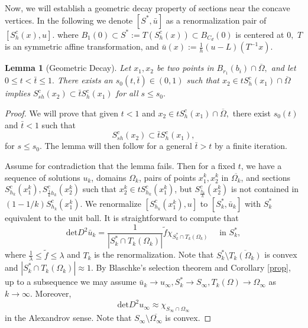 \documentclass[11pt]{amsart}
\theoremstyle{plain}
\newtheorem{lemma}{Lemma}[section]
\renewcommand{\det}{\mbox{det}}
\newcommand{\0}{\textbf{0}}
\numberwithin{equation}{section}
\numberwithin{equation}{section}
\numberwithin{figure}{section}
\begin{document}
	Now, we will establish a geometric decay property of sections near the concave vertices.
	In the following we denote $[S^*,\bar{u}]$ as a renormalization pair of $[S_h^c(x), u].$
	where $B_1(0)\subset S^*:=T(S_h^c(x))\subset B_{C_d}(0)$ is centered at $0,$  $T$ is an symmetric affine transformation, and $\bar{u}(x):=\frac{1}{h}(u-L)(T^{-1}x).$
	\begin{lemma}[Geometric Decay]\label{geodecay}
		Let $x_1,x_2$ be two points in $B_{r_1}(b_i)\cap \overline{\Omega},$ and let $0\leq t<\bar{t}\leq 1.$ There exists an $s_0(t,\bar{t})\in (0,1)$ such that $x_2\in t S^c_h(x_1)\cap \overline{\Omega}$ implies $S^c_{sh}(x_2)\subset \bar{t} S^c_h(x_1)$ for all $s\leq s_0.$
	\end{lemma}
	\begin{proof}
		We will prove that given $t<1$ and $x_2\in t S^c_h(x_1)\cap \overline{\Omega},$ there exist $s_0(t)$ and $\bar{t}<1$ such that
		$$
		S^c_{s h}\left(x_2\right) \subset \bar{t} S^c_h\left(x_1\right),
		$$
		for $s\leq s_0.$
		The lemma will then follow for a general $\bar{t}>t$ by a finite iteration.
		
		Assume for contradiction that the lemma fails. Then for a fixed $t$, we have a sequence of solutions $u_k$, domains $\Omega_k$, pairs of points $x_1^k, x_2^k$ in $\overline{\Omega_k}$, and sections $
		S^c_{h_k}\left(x_1^k\right), S^c_{\frac{1}{k} h_k}\left(x_2^k\right)
		$ such that $x_2^k \in t S^c_{h_k}\left(x_1^k\right)$, but $S^c_{\frac{h_k}{k}}\left(x_2^k\right)$ is not contained in $(1-1 / k) S^c_{h_k}\left(x_1^k\right)$. 
		We renormalize $\left[S^c_{h_k}\left(x_1^k\right), u\right]$ to $\left[S_k^*, \bar{u}_k\right]$ with $S_k^*$ equivalent to the unit ball. It is straightforward to compute that 
		$$\det D^2 \bar{u}_k=\frac{1}{|S_k^*\cap T_k(\Omega_k)|}\tilde{f}\chi_{S_k^*\cap T_k(\Omega_k)} \quad \text{ in }S^*_k,$$ where $\frac{1}{\lambda}\leq \tilde{f}\leq \lambda$ and $T_k$ is the renormalization. Note that $S_k^*\setminus \overline{T_k(\Omega_k)}$ is convex and $|S_k^*\cap T_k(\Omega_k)|\approx 1.$
		By Blaschke's selection theorem and Corollary \ref{prop}, up to a subsequence we may assume
		$\bar u_k\rightarrow u_\infty, S^*_k\rightarrow S_\infty, T_k(\Omega)\rightarrow \Omega_\infty$ as $k\rightarrow \infty.$ Moreover, $$\det D^2 u_{\infty}\approx \chi_{S_{\infty}\cap \Omega_{\infty}}$$ in the Alexandrov sense. Note that $S_\infty\setminus\overline{\Omega_\infty}$ is convex.
		

\end{proof}
\end{document}
